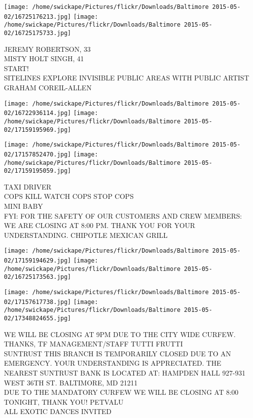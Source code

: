 \documentclass[10pt,letterpaper]{article}
\begin{document}
\texttt{[image: /home/swickape/Pictures/flickr/Downloads/Baltimore 2015-05-02/16725176213.jpg]}
\texttt{[image: /home/swickape/Pictures/flickr/Downloads/Baltimore 2015-05-02/16725175733.jpg]}

JEREMY ROBERTSON, 33\\
MISTY HOLT SINGH, 41\\
START!\\
SITELINES EXPLORE INVISIBLE PUBLIC AREAS WITH PUBLIC ARTIST GRAHAM COREIL{-}ALLEN\\
\pagebreak

\texttt{[image: /home/swickape/Pictures/flickr/Downloads/Baltimore 2015-05-02/16722936114.jpg]}
\texttt{[image: /home/swickape/Pictures/flickr/Downloads/Baltimore 2015-05-02/17159195969.jpg]}

\texttt{[image: /home/swickape/Pictures/flickr/Downloads/Baltimore 2015-05-02/17157852470.jpg]}
\texttt{[image: /home/swickape/Pictures/flickr/Downloads/Baltimore 2015-05-02/17159195059.jpg]}

TAXI DRIVER\\
COPS KILL WATCH COPS STOP COPS\\
MINI BABY\\
FYI: FOR THE SAFETY OF OUR CUSTOMERS AND CREW MEMBERS: WE ARE CLOSING AT 8:00 PM.  THANK YOU FOR YOUR UNDERSTANDING.  CHIPOTLE MEXICAN GRILL\\
\pagebreak

\texttt{[image: /home/swickape/Pictures/flickr/Downloads/Baltimore 2015-05-02/17159194629.jpg]}
\texttt{[image: /home/swickape/Pictures/flickr/Downloads/Baltimore 2015-05-02/16725173563.jpg]}

\texttt{[image: /home/swickape/Pictures/flickr/Downloads/Baltimore 2015-05-02/17157617738.jpg]}
\texttt{[image: /home/swickape/Pictures/flickr/Downloads/Baltimore 2015-05-02/17348824655.jpg]}

WE WILL BE CLOSING AT 9PM DUE TO THE CITY WIDE CURFEW.  THANKS, TF MANAGEMENT/STAFF  TUTTI FRUTTI\\
SUNTRUST THIS BRANCH IS TEMPORARILY CLOSED DUE TO AN EMERGENCY.  YOUR UNDERSTANDING IS APPRECIATED.  THE NEAREST SUNTRUST BANK IS LOCATED AT: HAMPDEN HALL 927{-}931 WEST 36TH ST. BALTIMORE, MD 21211\\
DUE TO THE MANDATORY CURFEW WE WILL BE CLOSING AT 8:00 TONIGHT, THANK YOU!  PETVALU\\
ALL EXOTIC DANCES INVITED\\
\pagebreak
\end{document}
